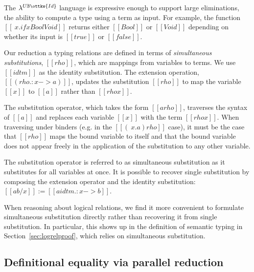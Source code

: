 \documentclass[acmsmall,screen=true,
\ifpublic review=false\else,review=true\fi
  ,anonymous=\ifanonymous true\else false\fi]{acmart}
\newcommand{\lang}{$\lambda^{U\mathbb{B}\ottkw{Id}}$\xspace}
\newcommand{\scw}[1]{}
\begin{document}

The \lang language is expressive enough to support large
eliminations, the ability to compute a type using a term as input. For
example, the function $[[\ x . if x Bool Void]]$ returns
either $[[Bool]]$ or $[[Void]]$ depending on whether its
input is $[[true]]$ or $[[false]]$.

Our reduction a typing relations are defined in terms of \emph{simultaneous
  substitutions}, $[[rho]]$, which are mappings from variables to terms.  We
use $[[idtm]]$ as the identity substitution.  The extension operation,
$[[(rho .: x -> a)]]$, updates the substitution $[[rho]]$ to map the variable
$[[x]]$ to $[[a]]$ rather than $[[rho x]]$.

The substitution operator, which takes the form $[[a {rho}]]$, traverses the
syntax of $[[a]]$ and replaces each variable $[[x]]$ with the term
$[[rho x]]$. When traversing under binders (e.g. in the
$[[(\ x . a) { rho }]]$ case), it must be the case that $[[rho]]$ maps the
bound variable to itself and that the bound variable does not appear freely in
the application of the substitution to any other variable.
%
\scw{Maybe we should handwave more here, and note that we aren't covering all
  of the details of the treatment of variable binding in the text. If readers
  want to understand that part, they should look at the Coq code, which uses
  de Bruijn indices anyways. Our goal is to convey the understanding of the
  Coq proof. }

The substitution operator is referred to as simultaneous substitution as it
substitutes for all variables at once. It is possible to recover single
substitution by composing the extension operator and the identity
substitution: $[[a { b / x }]] := [[a { idtm .: x -> b }]]$.

When reasoning about logical relations, we find it more convenient to
formulate simultaneous substitution directly rather than recovering it from
single substitution.  In particular, this shows up in the definition of
semantic typing in Section~\ref{sec:logrelproof}, which relies on simultaneous
substitution.

\subsection{Definitional equality via parallel reduction}
\end{document}

